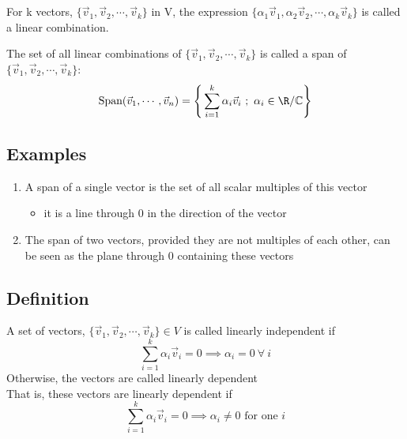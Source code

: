 \documentclass[a4paper, 11pt, normalem]{report}
\begin{document}
\chapter{}
For k vectors, $\{\vec{v}_{1},\vec{v}_{2},\cdots,\vec{v}_{k}\}$ in V, the expression $\{\alpha_{1}\vec{v}_{1},\alpha_{2}\vec{v}_{2},\cdots,\alpha_{k}\vec{v}_{k}\}$ is called a linear combination.

The set of all linear combinations of $\{\vec{v}_{1},\vec{v}_{2},\cdots,\vec{v}_{k}\}$ is called a span of $\{\vec{v}_{1},\vec{v}_{2},\cdots,\vec{v}_{k}\}$:
\begin{equation*}
    \text{Span}(\vec{v}_{1},\cdots,\vec{v}_{n}) = \Bigg\{\sum_{i = 1}^{k} \alpha_{i}\vec{v}_{i} ~;~ \alpha_{i} \in \R / \mathbb{C} \Bigg\}
\end{equation*}

\section{Examples}
\begin{enumerate}
    \item A span of a single vector is the set of all scalar multiples of this vector
        \begin{itemize}
            \item it is a line through 0 in the direction of the vector
        \end{itemize}
    \item The span of two vectors, provided they are not multiples of each other, can be seen as the plane through 0 containing these vectors
\end{enumerate}

\section{Definition}
A set of vectors, $\{\vec{v}_{1},\vec{v}_{2},\cdots,\vec{v}_{k}\} \in V$ is called linearly independent if
\begin{equation*}
    \sum_{i = 1}^{k} \alpha_{i}\vec{v}_{i} = 0 \implies \alpha_{i} = 0 ~\forall~ i
\end{equation*}
Otherwise, the vectors are called linearly dependent \\
That is, these vectors are linearly dependent if
\begin{equation*}
    \sum_{i = 1}^{k} \alpha_{i}\vec{v}_{i} = 0 \implies \alpha_{i} \neq 0 \text{ for one }i
\end{equation*}
\end{document}
